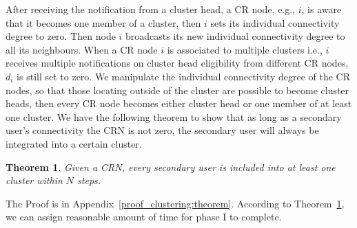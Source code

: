 \documentclass[10pt,journal,compsoc]{IEEEtran}
\makeatletter
\theoremstyle{mytheoremstyle}
\newtheorem{theorem}{Theorem}[section]
\theoremstyle{mytheoremstyle}
\theoremstyle{mytheoremstyle}
\renewenvironment{proof}[1][\proofname]{%
      \par\pushQED{\qed}\fontfamily{ptm}\selectfont%
      \topsep6\p@\@plus6\p@\relax
      \trivlist\item[\hskip\labelsep\bfseries#1\@addpunct{.}]%
      \ignorespaces
    }{%
      \popQED\endtrivlist\@endpefalse
    }
\newcommand{\eg}{e.g., }
\newcommand{\ie}{i.e., }
\makeatother
\begin{document}
After receiving the notification from a cluster head, a CR node, \eg $i$, is aware that it becomes one member of a cluster, then $i$ sets its individual connectivity degree to zero. %
Then node $i$ broadcasts its new individual connectivity degree to all its neighbours. 
When a CR node $i$ is associated to multiple clusters \ie $i$ receives multiple notifications on cluster head eligibility from different CR nodes, $d_i$ is still set to zero. %
%
%
We manipulate the individual connectivity degree of the CR nodes, so that those locating outside of the cluster are possible to become cluster heads, then every CR node becomes either cluster head or one member of at least one cluster.
We have the following theorem to show that as long as a secondary user's connectivity the CRN is not zero, the secondary user will always be integrated into a certain cluster.
\begin{theorem}
\label{clustering:theorem}
Given a CRN, every secondary user is included into at least one cluster within $N$ steps.
\end{theorem}
The Proof is in Appendix~\ref{proof_clustering:theorem}.
According to Theorem~\ref{clustering:theorem}, we can assign reasonable amount of time for phase I to complete.
\end{document}
